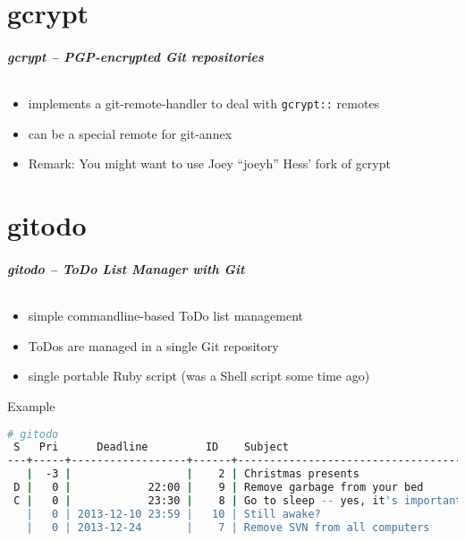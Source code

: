 \documentclass[english,hyperref={pdfpagelabels=false},aspectratio=169]{beamer}
\begin{document}
\part{gcrypt}
\makepart

\begin{frame}[label=gcrypt]
  \frametitle{gcrypt -- PGP-encrypted Git repositories}
  \framesubtitle{}
  \begin{itemize}
    \item implements a git-remote-handler to deal with \texttt{gcrypt::} remotes
    \item can be a special remote for git-annex
    \item Remark: You might want to use Joey ``joeyh'' Hess' fork of gcrypt
  \end{itemize}
\end{frame}


\part{gitodo}
\makepart

\begin{frame}[label=gitodo,fragile]
  \frametitle{gitodo -- ToDo List Manager with Git}
  \framesubtitle{}
  \begin{itemize}
    \item simple commandline-based ToDo list management
    \item ToDos are managed in a single Git repository
    \item single portable Ruby script {\scriptsize\color{fzjgray50}(was a Shell script some time ago)}
  \end{itemize}
  \begin{block}{Example}
    \vspace{-0.75em}
    \begin{lstlisting}[language=sh,basicstyle=\scriptsize\ttfamily,commentstyle=\normalfont\ttfamily\color{fzjgray50}]
# gitodo
 S   Pri      Deadline         ID    Subject
---+-----+------------------+------+-----------------------------------
   |  -3 |                  |    2 | Christmas presents
 D |   0 |            22:00 |    9 | Remove garbage from your bed
 C |   0 |            23:30 |    8 | Go to sleep -- yes, it's important
   |   0 | 2013-12-10 23:59 |   10 | Still awake?
   |   0 | 2013-12-24       |    7 | Remove SVN from all computers
    \end{lstlisting}
    \vspace{-0.75em}
  \end{block}
\end{frame}
\end{document}
